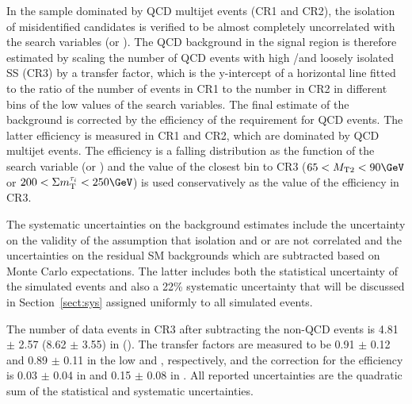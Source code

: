 In the sample dominated by QCD multijet events (CR1 and CR2), the isolation of misidentified \Tau candidates is verified 
to be almost completely uncorrelated with the search variables (\mttwo or \SumMT).
The QCD background in the signal region is therefore estimated by scaling the number of QCD events with high \mttwo/\SumMT and loosely isolated SS \tauTau (CR3) by a transfer factor, %
which is the y-intercept of a horizontal line fitted to the ratio of the number of events in CR1 to the number in CR2 in different bins of the low values of the search variables.
The final estimate of the background 
is corrected by the efficiency of 
the \deltaphi requirement for QCD events. The latter efficiency is measured in CR1 and CR2, 
which are dominated by QCD multijet events. The efficiency is a falling distribution as the function of 
the search variable (\mttwo or \SumMT)
and the value of the closest bin to CR3 ($65<\mttwo<90\GeV$ or $200<\SumMT<250\GeV$) is used conservatively as the 
value of the efficiency in CR3.

The systematic uncertainties on the background estimates include the uncertainty on the validity of the assumption that isolation and \mttwo or \SumMT are not correlated and the uncertainties on the residual 
SM backgrounds which  are subtracted based on Monte Carlo expectations. 
The latter includes both the statistical uncertainty of the simulated 
events and also a 22\% systematic uncertainty that will be discussed in Section~\ref{sect:sys} 
assigned uniformly to all simulated events.

The number of data events in CR3 after subtracting the non-QCD events is 4.81 $\pm$ 2.57 (8.62 $\pm$ 3.55) in \binone (\bintwo).
The transfer factors are measured to be 0.91 $\pm$ 0.12 and 0.89 $\pm$ 0.11 in the low \mttwo and \SumMT, respectively, and 
the correction for the \deltaphi efficiency is 0.03 $\pm$ 0.04 in \binone and 0.15 $\pm$ 0.08 in \bintwo. 
All reported uncertainties are the quadratic sum of the statistical and systematic uncertainties.

